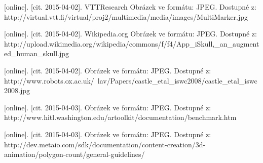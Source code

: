\documentclass[twoside,12pt]{article}
\begin{document}
\begin{literatura}
{
	[online]. [cit. 2015-04-02]. VTTResearch
	Obrázek ve formátu: JPEG. Dostupné z: http://virtual.vtt.fi/virtual/proj2/multimedia/media/images/MultiMarker.jpg
}

{
	[online]. [cit. 2015-04-02]. Wikipedia.org
	Obrázek ve formátu: JPEG. Dostupné z: http://upload.wikimedia.org/wikipedia/commons/f/f4/App\_iSkull,\_an\_augmented\_human\_skull.jpg
}

{
	[online]. [cit. 2015-04-02]. 
	Obrázek ve formátu: JPEG. Dostupné z: http://www.robots.ox.ac.uk/~lav/Papers/castle\_etal\_iswc2008/castle\_etal\_iswc2008.jpg
}

{
	[online]. [cit. 2015-04-03]. 
	Obrázek ve formátu: JPEG. Dostupné z: http://www.hitl.washington.edu/artoolkit/documentation/benchmark.htm
}

{
	[online]. [cit. 2015-04-03]. 
	Obrázek ve formátu: JPEG. Dostupné z: http://dev.metaio.com/sdk/documentation/content-creation/3d-animation/polygon-count/general-guidelines/
}





%




\end{literatura}
\end{document}
